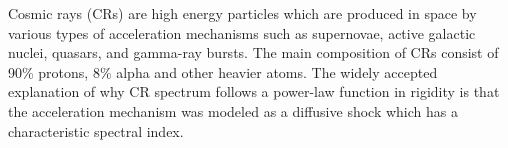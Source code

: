 
Cosmic rays (CRs) are high energy particles which are produced in space by various types
of acceleration mechanisms such as supernovae, active galactic nuclei, quasars, and
gamma-ray bursts. The main composition of CRs consist of 90\% protons, 8\% alpha
and other heavier atoms.
The widely accepted explanation of why CR spectrum follows a power-law function in rigidity is that the acceleration mechanism was modeled as a diffusive shock which has a characteristic spectral index.

